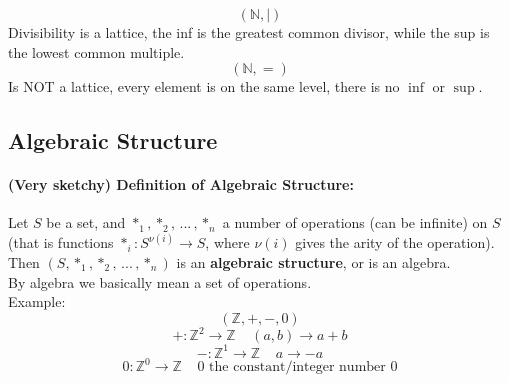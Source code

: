 \documentclass[11pt]{article}
\begin{document}
	$$ (\mathbb{N}, |) $$
	Divisibility is a lattice, the inf is the greatest common divisor, while the sup is the lowest common multiple.\\
	
	$$ (\mathbb{N}, =) $$
	Is NOT a lattice, every element is on the same level, there is no $\inf$ or $\sup$.\\
	
	
%	
%	
%	
%	
%	
%	
	
	\newpage
	
	\subsection{Algebraic Structure}
	
	
	\paragraph{(Very sketchy) Definition of Algebraic Structure:} Let $S$ be a set, and $\ast_1, \ast_2, \, ... \, , \ast_n$ a number of operations (can be infinite) on $S$ (that is functions $\ast_i : S^{\nu(i)} \rightarrow S$, where $\nu(i)$ gives the arity of the operation).\\
	
	Then $(S, \ast_1, \ast_2, \, ... \, , \ast_n)$ is an \textbf{algebraic structure}, or is an algebra. \\
	
	By algebra we basically mean a set of operations.\\
	
	Example:
	$$ (\mathbb{Z}, +, -, 0) $$
	$$ + : \mathbb{Z}^2 \rightarrow \mathbb{Z} \;\;\;\; (a,b) \rightarrow a + b $$
	$$ - : \mathbb{Z}^1 \rightarrow \mathbb{Z} \;\;\;\; a \rightarrow - a $$
	$$ 0 : \mathbb{Z}^0 \rightarrow \mathbb{Z} \;\;\;\; 0 \text{ the constant/integer number } 0 $$
	
\end{document}
